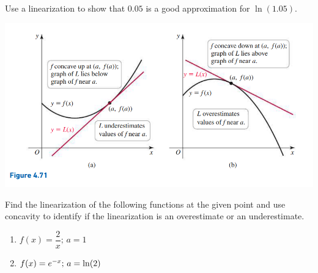 \documentclass[mathNotesPreamble]{subfiles}
\begin{document}
\begin{ex*}
  Use a linearization to show that $0.05$ is a good approximation for $\ln(1.05)$.
\end{ex*}
\pagebreak
\noindent
{}
\begin{center}
    \includegraphics[scale=0.5]{images/briggs_04_06/fig4_71}
\end{center}

\begin{ex*}
  Find the linearization of the following functions at the given point and use concavity to identify if the linearization is an overestimate or an underestimate.
\end{ex*}
\begin{enumerate}[label=\alph*),itemsep=\stretch{1}]
  \item $f(x)=\dfrac{2}{x};\, a=1$
  \item $f(x)=e\inv[x];\, a=\ln(2)$
\end{enumerate}
\pagebreak

\end{document}
